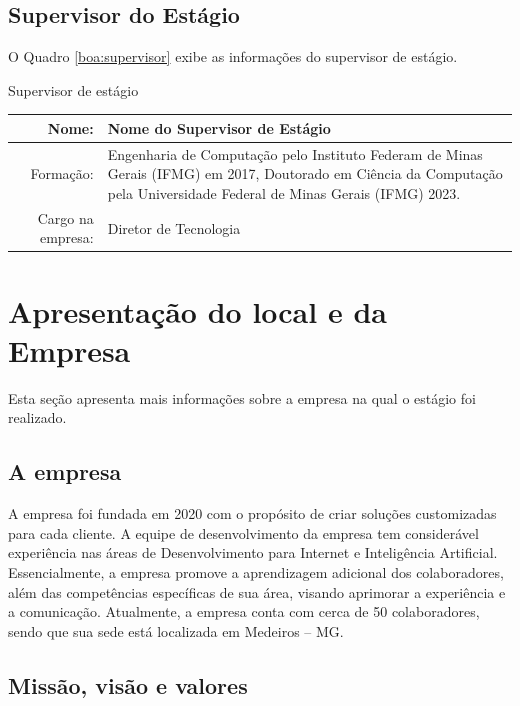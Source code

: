\documentclass[estagio]{iftex2024}
\begin{document}
\subsection{Supervisor do Estágio}

O Quadro \ref{boa:supervisor} exibe as informações do supervisor de estágio.

\begin{board}[!htb] \centering
\caption{Supervisor de estágio} \label{boa:supervisor}
\begin{varwidth}{\linewidth}
  \begin{tabularx}{\linewidth}{|r|X|} \hline
  Nome:             & Nome do Supervisor de Estágio \\ \hline
  Formação:         & Engenharia de Computação pelo Instituto Federam de Minas Gerais (IFMG) em 2017, Doutorado em Ciência da Computação pela Universidade Federal de Minas Gerais (IFMG) 2023. \\ \hline
  Cargo na empresa: & Diretor de Tecnologia   \\ \hline
  \end{tabularx}
\end{varwidth}
\end{board}


\section{Apresentação do local e da Empresa} \label{sec:apresentacao}

Esta seção apresenta mais informações sobre a empresa na qual o estágio foi realizado.

\subsection{A empresa} \label{subsec:empresa}

A empresa {\theEmpresa} foi fundada em 2020 com o propósito de criar soluções customizadas para cada cliente.
A equipe de desenvolvimento da empresa tem considerável experiência nas áreas de Desenvolvimento para Internet e Inteligência Artificial.
Essencialmente, a empresa promove a aprendizagem adicional dos colaboradores, além das competências específicas de sua área, visando aprimorar a experiência e a comunicação.
Atualmente, a empresa conta com cerca de 50 colaboradores, sendo que sua sede está localizada em Medeiros -- MG.

\subsection{Missão, visão e valores}
\end{document}
